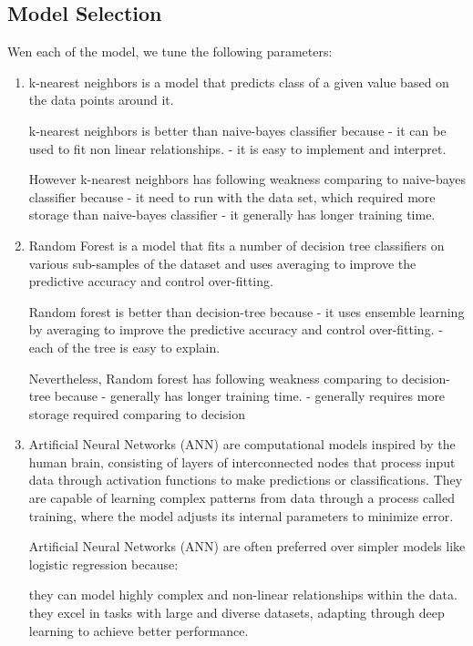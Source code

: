 \subsection{Model Selection}

Wen each of the model, we tune the following parameters:
\begin{enumerate}
    \item
          k-nearest neighbors is a model that predicts class of a given value based on the data points around it.

          k-nearest neighbors is better than naive-bayes classifier because
          - it can be used to fit non linear relationships.
          - it is easy to implement and interpret.

          However k-nearest neighbors has following weakness comparing to naive-bayes classifier because
          - it need to run with the data set, which required more storage than naive-bayes classifier
          - it generally has longer training time.

    \item
          Random Forest is a model that fits a number of decision tree classifiers on various sub-samples of the dataset and uses averaging to improve the predictive accuracy and control over-fitting.

          Random forest is better than decision-tree because
          - it uses ensemble learning by averaging to improve the predictive accuracy and control over-fitting.
          - each of the tree is easy to explain.

          Nevertheless, Random forest has following weakness comparing to  decision-tree because
          - generally has longer training time.
          - generally requires more storage required comparing to decision

    \item Artificial Neural Networks (ANN) are computational models inspired by the human brain, consisting of layers of interconnected nodes that process input data through activation functions to make predictions or classifications. They are capable of learning complex patterns from data through a process called training, where the model adjusts its internal parameters to minimize error.


          Artificial Neural Networks (ANN) are often preferred over simpler models like logistic regression because:

          they can model highly complex and non-linear relationships within the data.
          they excel in tasks with large and diverse datasets, adapting through deep learning to achieve better performance.



\end{enumerate}
